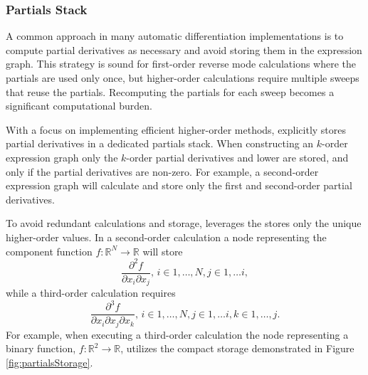 \subsubsection{Partials Stack}

A common approach in many automatic differentiation implementations
is to compute partial derivatives as necessary and avoid storing them
in the expression graph.  This strategy is sound for first-order reverse
mode calculations where the partials are used only once, but higher-order
calculations require multiple sweeps that reuse the partials.  Recomputing
the partials for each sweep becomes a significant computational burden.

With a focus on implementing efficient higher-order methods, \nomad 
explicitly stores partial derivatives in a dedicated partials stack.  When 
constructing an $k$-order expression graph only the $k$-order partial 
derivatives and lower are stored, and only if the partial derivatives are 
non-zero.  For example, a second-order expression graph will calculate 
and store only the first and second-order partial derivatives.

To avoid redundant calculations and storage, \nomad leverages the 
stores only the unique higher-order values.  In a second-order calculation 
a node representing the component function 
$f: \mathbb{R}^{N} \rightarrow \mathbb{R}$ will store
%
\begin{equation*}
\frac{ \partial^{2} f }{ \partial x_{i} \partial x_{j} }, \, i \in 1, \ldots, N, j \in 1, \ldots i,
\end{equation*}
%
while a third-order calculation requires
%
\begin{equation*}
\frac{ \partial^{3} f }{ \partial x_{i} \partial x_{j} \partial x_{k} }, \, 
i \in 1, \ldots, N, j \in 1, \ldots i, k \in 1, \ldots, j.
\end{equation*}
%
For example, when executing a third-order calculation the node representing
a binary function, $f : \mathbb{R}^{2} \rightarrow \mathbb{R}$, utilizes the
compact storage demonstrated in Figure \ref{fig:partialsStorage}.

